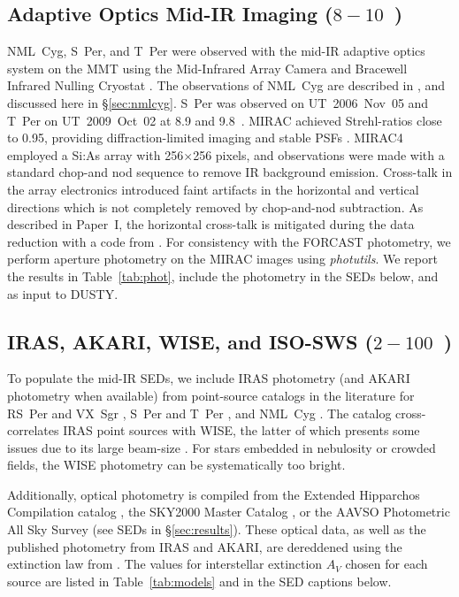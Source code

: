 \documentclass[modern]{aastex61}
\begin{document}
\subsection{Adaptive Optics Mid-IR Imaging ($8-10$~\micron)}
NML~Cyg, S~Per, and T~Per were observed with the mid-IR adaptive optics system on the MMT using the Mid-Infrared Array Camera and Bracewell Infrared Nulling Cryostat \citep[MIRAC3/4/MIRAC-BLINC;][]{hoffmann1998, hinz2000, skemer2008}.  The observations of NML~Cyg are described in \cite{schuster2009}, and discussed here in \S\ref{sec:nmlcyg}.  S~Per was observed on UT~2006~Nov~05 and T~Per on UT~2009~Oct~02 at 8.9 and 9.8~\micron.  MIRAC achieved Strehl-ratios close to 0.95, providing diffraction-limited imaging and stable PSFs \citep[e.g.][]{biller2005}.   MIRAC4 employed a Si:As array with 256$\times$256 pixels, and observations were made with a standard chop-and nod sequence to remove IR background emission.  Cross-talk in the array electronics introduced faint artifacts in the horizontal and vertical directions which is not completely removed by chop-and-nod subtraction. As described in Paper~I, the horizontal cross-talk is mitigated during the data reduction with a code from \cite{skemer2008}.  For consistency with the FORCAST photometry, we perform aperture photometry on the MIRAC images using \textit{photutils}. We report the results in Table~\ref{tab:phot}, include the photometry in the SEDs below, and as input to DUSTY.

\subsection{IRAS, AKARI, WISE, and ISO-SWS ($2-100$~\micron)}
To populate the mid-IR SEDs, we include IRAS photometry (and AKARI photometry when available) from point-source catalogs in the literature for RS~Per and VX~Sgr \citep{smith2004}, S~Per and T~Per \citep{abrahamyan2015}, and NML~Cyg \citep{schuster2007}. The \cite{abrahamyan2015} catalog cross-correlates IRAS point sources with WISE, the latter of which presents some issues due to its large beam-size \citep[up to 12\arcsec\ at 22~\micron;][]{wright2010}. For stars embedded in nebulosity or crowded fields, the WISE photometry can be systematically too bright.

Additionally, optical photometry is compiled from the Extended Hipparchos Compilation catalog \citep[XHIP;][]{anderson2012}, the SKY2000 Master Catalog \citep{myers2015}, or the AAVSO Photometric All Sky Survey \citep[APASS;][]{henden2016} (see SEDs in \S\ref{sec:results}).  These optical data, as well as the published photometry from IRAS and AKARI, are dereddened using the extinction law from \cite{odonnell1994}. The values for interstellar extinction $A_V$ chosen for each source are listed in Table~\ref{tab:models} and in the SED captions below.
\end{document}
